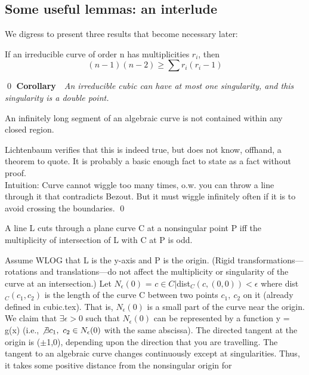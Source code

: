 \subsection{Some useful lemmas: an interlude}
We digress to present three results that become necessary later:
\begin{lemma}\nopagebreak
\label{singbound}
If an irreducible curve of order n has
multiplicities $r_{i}$, then
 \[ (n-1)(n-2) \geq \sum r_{i}(r_{i}-1) \]
\end{lemma}
\proof
\cite[p.\ 65]{wa}
\qed
{\bf Corollary}\ \ 
{\em An irreducible cubic can have at most one singularity, and this
singularity is a double point.}
\begin{lemma}\nopagebreak 
\label{nonbounded}
An infinitely long segment of an algebraic curve is not contained within any
closed region.
\end{lemma}
\proof
Lichtenbaum verifies that this is indeed true, but does not know, offhand,
a theorem to quote.  It is probably a basic enough fact to state as a fact
without proof.\\
Intuition:  Curve cannot wiggle too many times, o.w. you can throw a line
through it that contradicts Bezout.  But it must wiggle infinitely often
if it is to avoid crossing the boundaries.
\qed
\begin{lemma}\nopagebreak 
\label{planarcutsthru}
A line L cuts through a plane curve C at a nonsingular point P
iff the multiplicity of intersection of L with C at P is odd.
\end{lemma}
\proof
Assume WLOG that L is the y-axis and P is the origin. (Rigid
transformations---rotations and translations---do not affect the 
multiplicity or singularity of the curve at an intersection.)
Let $N_{\epsilon}(0)$ = {$c\in C |$dist$_{C}(c,(0,0)) < \epsilon$}
where dist$_{C}(c_{1},c_{2})$ is the length of the curve C between
two points $c_{1},\ c_{2}$ on it (already defined in cubic.tex).
That is, $N_{\epsilon}(0)$ is a small part of the curve near the
origin.  We claim that $\exists \epsilon > 0$ such that $N_{\epsilon}(0)$
can be represented by a function y = g(x) (i.e., $\not\exists
c_{1},\ c_{2} \in N_{\epsilon}(0)$ with the same abscissa).
The directed tangent at the origin is ($\pm$1,0), depending upon
the direction that you are travelling.  
The tangent to an algebraic curve
changes continuously except at singularities.
Thus, it takes some positive distance from the nonsingular origin for
